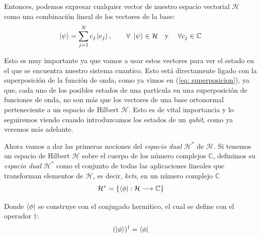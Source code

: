 \documentclass{article}
\numberwithin{equation}{section} %
\begin{document}
    \vspace{1.5mm}

    Entonces, podemos expresar cualquier vector de nuestro espacio vectorial \( \mathcal{H} \) como una combinación lineal de los vectores de la base:
    \begin{equation}
        \ket{\psi} = \sum_{j = 1}^{N} c_{j} \ket{e_{j}}, \qquad \forall \ \ket{\psi} \in \mathcal{H} \quad \text{y} \quad \ \forall c_{j} \in \mathbb{C}
        \label{eq: combinacion_lineal_Hilbert}
    \end{equation}

    \vspace{1.5mm}

    Esto es muy importante ya que vamos a usar estos vectores para ver el estado en el que se encuentra nuestro sistema cuantico. Esto está directamente ligado con la superposición de la función de onda, como ya vimos en (\ref{eq: superposicion}), ya que, cada uno de los posibles estados de una partícula en una superposición de funciones de onda, no son más que los vectores de una base ortonormal perteneciente a un espacio de Hilbert \( \mathcal{H} \). Esto es de vital importancia y lo seguiremos viendo cuando introduzcamos los estados de un \textit{qubit}, como ya veremos más adelante.

    \vspace{5mm}

    Ahora vamos a dar las primeras nociones del \textit{espacio dual} \( \mathcal{H} ^ {*} \) de \( \mathcal{H} \). Si tenemos un espacio de Hilbert \( \mathcal{H} \) sobre el cuerpo de los número complejos \( \mathbb{C} \), definimos su \textit{espacio dual} \( \mathcal{H} ^ {*} \) como el conjunto de todas las aplicaciones lineales que transforman elementos de \( \mathcal{H} \), es decir, \textit{kets}, en un número complejo \( \mathbb{C} \)
    \begin{equation*}
        \mathcal{H} ^ {*} = \{ \bra{\phi}: \mathcal{H} \longrightarrow \mathbb{C} \}
    \end{equation*}

    \vspace{1.5mm}

    Donde \( \bra{\phi} \) se construye con el conjugado hermítico, el cual se define con el operador \( \dagger \):
    \begin{equation*}
        ( \ket{\phi} )^{\dagger} = \bra{\phi}
    \end{equation*}

    \vspace{1.5mm}
\end{document}

